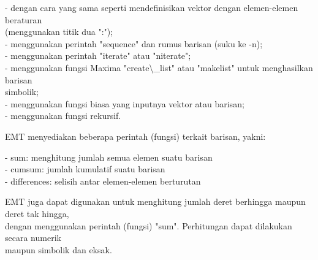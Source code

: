 \documentclass[12pt,arial,letterpaper]{book}
\begin{document}
\begin{eulernootebook}
\begin{eulercomment}
\begin{eulercomment}
\begin{eulernootebook}
\begin{eulercomment}
\begin{eulercomment}
\begin{eulercomment}
\begin{eulercomment}
\begin{eulercomment}
\begin{eulercomment}
\begin{eulernotebook}
\begin{eulercomment}
\begin{eulercomment}
\begin{eulercomment}
\begin{eulercomment}
\begin{eulercomment}
\begin{eulercomment}
\begin{eulercomment}
\begin{eulercomment}
\begin{eulercomment}
\begin{eulercomment}
\begin{eulercomment}
\begin{eulercomment}
\begin{eulercomment}
\begin{eulercomment}
\begin{eulercomment}
\begin{eulercomment}
\begin{eulercomment}
\begin{eulercomment}
\begin{eulercomment}
\begin{eulercomment}
\begin{eulercomment}
\begin{eulercomment}
\begin{eulercomment}
\begin{eulercomment}
\begin{eulercomment}
- dengan cara yang sama seperti mendefinisikan vektor dengan
elemen-elemen beraturan\\
(menggunakan titik dua ":");\\
- menggunakan perintah "sequence" dan rumus barisan (suku ke -n);\\
- menggunakan perintah "iterate" atau "niterate";\\
- menggunakan fungsi Maxima "create\textbackslash{}\_list" atau "makelist" untuk
menghasilkan barisan\\
simbolik;\\
- menggunakan fungsi biasa yang inputnya vektor atau barisan;\\
- menggunakan fungsi rekursif.

EMT menyediakan beberapa perintah (fungsi) terkait barisan, yakni:

- sum: menghitung jumlah semua elemen suatu barisan\\
- cumsum: jumlah kumulatif suatu barisan\\
- differences: selisih antar elemen-elemen berturutan

EMT juga dapat digunakan untuk menghitung jumlah deret berhingga
maupun deret tak hingga,\\
dengan menggunakan perintah (fungsi) "sum". Perhitungan dapat
dilakukan secara numerik\\
maupun simbolik dan eksak.


\end{eulercomment}
\end{eulercomment}
\end{eulercomment}
\end{eulercomment}
\end{eulercomment}
\end{eulercomment}
\end{eulercomment}
\end{eulercomment}
\end{eulercomment}
\end{eulercomment}
\end{eulercomment}
\end{eulercomment}
\end{eulercomment}
\end{eulercomment}
\end{eulercomment}
\end{eulercomment}
\end{eulercomment}
\end{eulercomment}
\end{eulercomment}
\end{eulercomment}
\end{eulercomment}
\end{eulercomment}
\end{eulercomment}
\end{eulercomment}
\end{eulercomment}
\end{eulernotebook}
\end{eulercomment}
\end{eulercomment}
\end{eulercomment}
\end{eulercomment}
\end{eulercomment}
\end{eulercomment}
\end{eulernootebook}
\end{eulercomment}
\end{eulercomment}
\end{eulernootebook}
\end{document}
